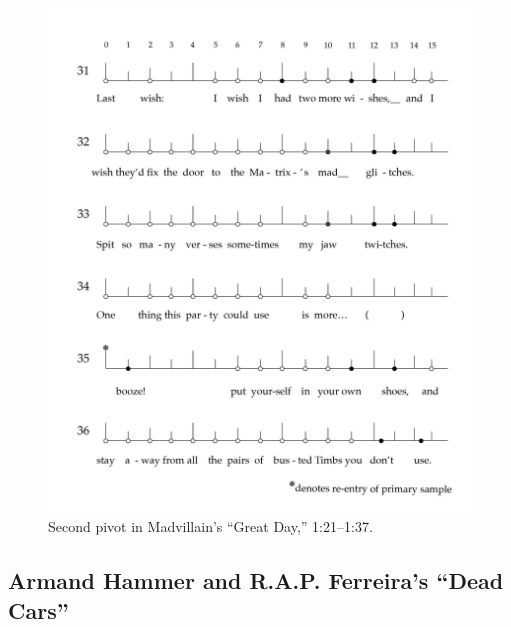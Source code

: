     \begin{figure}[!ht]
        \centering
        \includegraphics{images/figures/chp 03/121137greatdaysecondpivot.pdf}
        \caption{Second pivot in Madvillain's ``Great Day,'' 1:21--1:37.}
        \label{fig:doomsecondpiv}
    \end{figure}

\subsection*{\centering Armand Hammer and R.A.P. Ferreira's ``Dead Cars''}

